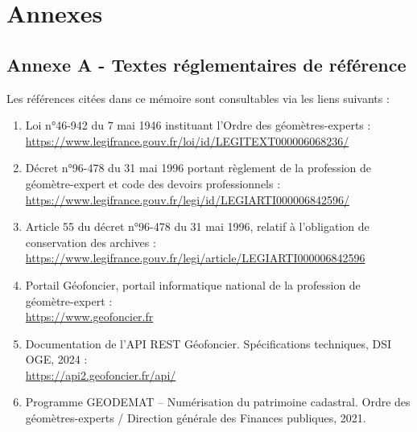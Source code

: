 
\appendix
{}
\section*{Annexes}





\subsection*{Annexe A - Textes réglementaires de référence}
\label{ann:textes_loi}

Les références citées dans ce mémoire sont consultables via les liens suivants :

\begin{enumerate}
  \item Loi n°46-942 du 7 mai 1946 instituant l'Ordre des géomètres-experts :\\
  \url{https://www.legifrance.gouv.fr/loi/id/LEGITEXT000006068236/}

  \item Décret n°96-478 du 31 mai 1996 portant règlement de la profession de géomètre-expert et code des devoirs professionnels :\\
  \url{https://www.legifrance.gouv.fr/legi/id/LEGIARTI000006842596/}

  \item Article 55 du décret n°96-478 du 31 mai 1996, relatif à l'obligation de conservation des archives :\\
  \url{https://www.legifrance.gouv.fr/legi/article/LEGIARTI000006842596}

  \item Portail Géofoncier, portail informatique national de la profession de géomètre-expert :\\
  \url{https://www.geofoncier.fr}

  \item Documentation de l'API REST Géofoncier. Spécifications techniques, DSI OGE, 2024 :\\
  \url{https://api2.geofoncier.fr/api/}

  \item Programme GEODEMAT -- Numérisation du patrimoine cadastral. Ordre des géomètres-experts / Direction générale des Finances publiques, 2021.
\end{enumerate}

